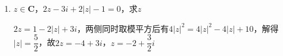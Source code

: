 \begin{enumerate}
\begin{jieda}
\begin{enumerate}
            \item 几何意义 \\
            设$\overline{z}$在复平面对应的点$Z'$，$A(2, -1)$，则有$|z| = 2 - i - \overline{z} \Longleftrightarrow \left \{\begin{array}{l}
                 |\vv{OZ'}| = |\vv{Z'A}|  \\
                 \vv{Z'A} // \vv{i}
            \end{array} \right. $，因此$Z' \left(\dfrac{3}{4}, -1\right)$，故$z = \dfrac{3}{4} + i$
        \end{enumerate}
    \end{jieda}
    \item $z \in \mathbf{C}$，$2z - 3i + 2|z| - 1 = 0$，求$z$
    \begin{jieda}
        $2z = 1-2|z|+3i$，两侧同时取模平方后有$4|z|^2 = 4|z|^2-4|z|+10$，解得$|z| = \dfrac{5}{2}$，故$2z = -4+3i$，$z = -2 + \dfrac{3}{2}i$
    \end{jieda}
\end{enumerate}
